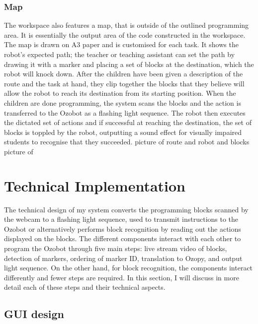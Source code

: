 \documentclass[oneside,%
                    author={Malak Hajji},
                    degree={BSc},
                    title={Designing An Accessible Computational Toolkit For Students},
                  subtitle={With Mixed Visual Abilities}]{dissertation}
\begin{document}
\subsubsection{Map}
The workspace also features a map, that is outside of the outlined programming area. It is essentially the output area of the code constructed in the workspace. 
The map is drawn on A3 paper and is customised for each task. It shows the robot's expected path; the teacher or teaching assistant can set the path by drawing it with a marker and placing a set of blocks at the destination, which the robot will knock down. After the children have been given a description of the route and the task at hand, they clip together the blocks that they believe will allow the robot to reach its destination from its starting position. When the children are done programming, the system scans the blocks and the action is transferred to the Ozobot as a flashing light sequence. The robot then executes the dictated set of actions and if successful at reaching the destination, the set of blocks is toppled by the robot, outputting a sound effect for visually impaired students to recognise that they succeeded. 
picture of route and robot and blocks 
picture of
\section{Technical Implementation}
The technical design of my system converts the programming blocks scanned by the webcam to a flashing light sequence, used to transmit instructions to the Ozobot or alternatively performs block recognition by reading out the actions displayed on the blocks. The different components interact with each other to program the Ozobot through five main steps: live stream video of blocks, detection of markers, ordering of marker ID, translation to Ozopy, and output light sequence. On the other hand, for block recognition, the components interact differently and fewer steps are required. In this section, I will discuss in more detail each of these steps and their technical aspects. 
 
\subsection{GUI design} 
 
\end{document}
